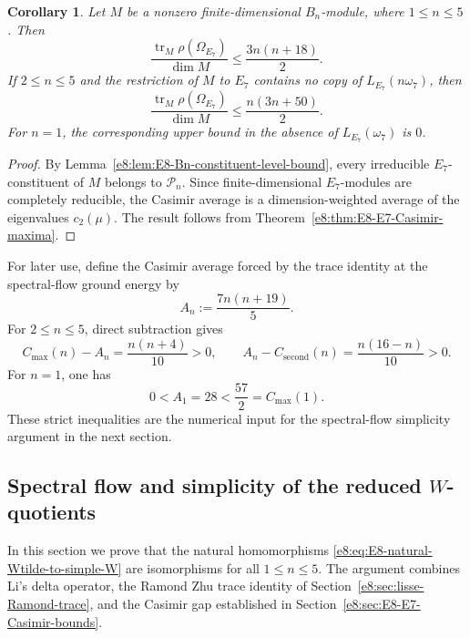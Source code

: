 \documentclass[11pt,reqno]{amsart}
\newtheorem{corollary}[theorem]{Corollary}
\theoremstyle{definition}
\theoremstyle{remark}
\providecommand{\tr}{\operatorname{tr}}
\begin{document}
\begin{corollary}
\label{e8:cor:E8-Casimir-average-bounds}
Let $M$ be a nonzero finite-dimensional $B_n$-module, where
$1\le n\le5$.  Then
\begin{equation*}
  \frac{\tr_M\rho(\Omega_{E_7})}{\dim M}
  \le \frac{3n(n+18)}2.
\end{equation*}
If $2\le n\le5$ and the restriction of $M$ to $E_7$ contains no copy of
$L_{E_7}(n\omega_7)$, then
\begin{equation*}
  \frac{\tr_M\rho(\Omega_{E_7})}{\dim M}
  \le \frac{n(3n+50)}2.
\end{equation*}
For $n=1$, the corresponding upper bound in the absence of
$L_{E_7}(\omega_7)$ is $0$.
\end{corollary}

\begin{proof}
By Lemma~\ref{e8:lem:E8-Bn-constituent-level-bound}, every irreducible
$E_7$-constituent of $M$ belongs to $\mathcal P_n$.  Since finite-dimensional
$E_7$-modules are completely reducible, the Casimir average is a
dimension-weighted average of the eigenvalues $c_2(\mu)$.  The result follows
from Theorem~\ref{e8:thm:E8-E7-Casimir-maxima}.
\end{proof}

For later use, define the Casimir average forced by the trace identity at the
spectral-flow ground energy by
\begin{equation}
  A_n:=\frac{7n(n+19)}5.
  \label{e8:eq:E8-ground-state-Casimir-average}
\end{equation}
For $2\le n\le5$, direct subtraction gives
\begin{equation}
  C_{\max}(n)-A_n=\frac{n(n+4)}{10}>0,
  \qquad
  A_n-C_{\mathrm{second}}(n)=\frac{n(16-n)}{10}>0.
  \label{e8:eq:E8-Casimir-strict-gap}
\end{equation}
For $n=1$, one has
\begin{equation}
  0<A_1=28<\frac{57}{2}=C_{\max}(1).
  \label{e8:eq:E8-Casimir-gap-n1}
\end{equation}
These strict inequalities are the numerical input for the spectral-flow
simplicity argument in the next section.

\subsection{Spectral flow and simplicity of the reduced \texorpdfstring{$W$}{W}-quotients}


In this section we prove that the natural homomorphisms
\eqref{e8:eq:E8-natural-Wtilde-to-simple-W} are isomorphisms for all
$1\le n\le5$.  The argument combines Li's delta operator, the Ramond Zhu
trace identity of Section~\ref{e8:sec:lisse-Ramond-trace}, and the Casimir gap
established in Section~\ref{e8:sec:E8-E7-Casimir-bounds}.
\end{document}
